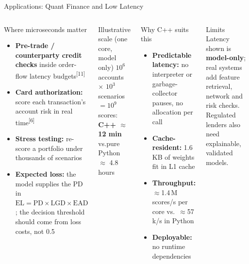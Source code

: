 \documentclass[aspectratio=169]{beamer}
\newcommand{\cit}[1]{\textsuperscript{\textcolor{accent}{[#1]}}}
\begin{document}
\begin{frame}{Applications: Quant Finance and Low Latency}
  \begin{columns}[T]
      \begin{block}{Where microseconds matter}
        \footnotesize
        \begin{itemize}
          \item \textbf{Pre-trade / counterparty credit checks} inside order-flow latency budgets\cit{11}
          \item \textbf{Card authorization:} score each transaction's account risk in real time\cit{6}
          \item \textbf{Stress testing:} re-score a portfolio under thousands of scenarios
          \item \textbf{Expected loss:} the model supplies the PD in
                $\mathrm{EL} = \mathrm{PD}\times\mathrm{LGD}\times\mathrm{EAD}$;
                the decision threshold should come from loss costs, not 0.5
        \end{itemize}
      \end{block}
      \begin{alertblock}{\footnotesize Illustrative scale (one core, model only)}
        \scriptsize
        $10^{6}$ accounts $\times$ $10^{3}$ scenarios $=10^{9}$ scores:\\
        \textbf{C++ $\approx$ 12 min} \quad vs.\quad pure Python $\approx$ 4.8 hours
      \end{alertblock}
      \begin{block}{Why C++ suits this}
        \footnotesize
        \begin{itemize}
          \item \textbf{Predictable latency:} no interpreter or garbage-collector pauses, no allocation per call
          \item \textbf{Cache-resident:} 1.6\,KB of weights fit in L1 cache
          \item \textbf{Throughput:} $\approx$1.4\,M scores/s per core vs.\ $\approx$57\,k/s in Python
          \item \textbf{Deployable:} no runtime dependencies
        \end{itemize}
      \end{block}
      \begin{block}{\footnotesize Limits}
        \scriptsize
        Latency shown is \textbf{model-only}; real systems add feature retrieval, network and risk checks.
        Regulated lenders also need explainable, validated models.
      \end{block}
  \end{columns}
\end{frame}
\end{document}
